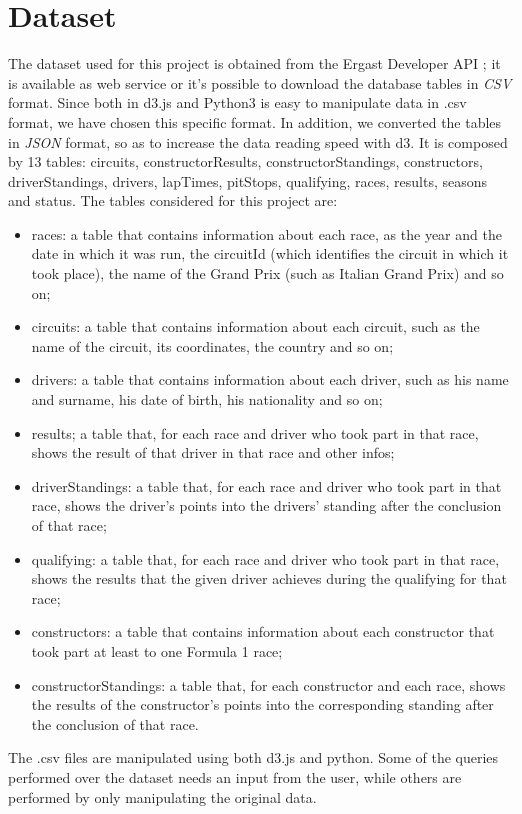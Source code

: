 \documentclass[11pt,twocolumn,letterpaper]{article}
\begin{document}
\section{Dataset}
The dataset used for this project is obtained from the Ergast Developer API \cite{Dataset}; it is available as web service or it's possible to download the database tables in \textit{CSV} format. Since both in d3.js \cite{D3} and Python3 is easy to manipulate data in .csv format, we have chosen this specific format. In addition, we converted the tables in \textit{JSON} format, so as to increase the data reading speed with d3. It is composed by 13 tables: circuits, constructorResults, constructorStandings, constructors, driverStandings, drivers, lapTimes, pitStops, qualifying, races, results, seasons and status. The tables considered for this project are:
\begin{itemize}
	\item races: a table that contains information about each race, as the year and the date in which it was run, the circuitId (which identifies the circuit in which it took place), the name of the Grand Prix (such as Italian Grand Prix) and so on;
	\item circuits: a table that contains information about each circuit, such as the name of the circuit, its coordinates, the country and so on;
	\item drivers: a table that contains information about each driver, such as his name and surname, his date of birth, his nationality and so on;
	\item results; a table that, for each race and driver who took part in that race, shows the result of that driver in that race and other infos;
	\item driverStandings: a table that, for each race and driver who took part in that race, shows the driver's points into the drivers' standing after the conclusion of that race;
	\item qualifying: a table that, for each race and driver who took part in that race, shows the results that the given driver achieves during the qualifying for that race;
	\item constructors: a table that contains information about each constructor that took part at least to one Formula 1 race;
	\item constructorStandings: a table that, for each constructor and each race, shows the results of the constructor's points into the corresponding standing after the conclusion of that race. 
\end{itemize}
The .csv files are manipulated using both d3.js and python. Some of the queries performed over the dataset needs an input from the user, while others are performed by only manipulating the original data.
\end{document}
